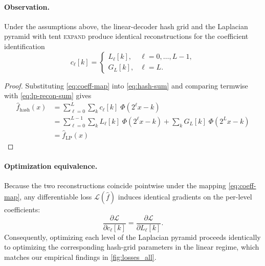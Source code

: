 \documentclass[a4paper,11pt,oneside]{article}
\numberwithin{equation}{section}
\begin{document}
\paragraph{Observation.}
Under the assumptions above, the linear-decoder hash grid and the Laplacian pyramid with tent \textsc{expand} produce identical reconstructions for the coefficient identification
\begin{equation}
\label{eq:coeff-map}
c_\ell[k]=
\begin{cases}
L_\ell[k], & \ell=0,\dots,L-1,\\[2pt]
G_L[k], & \ell=L.
\end{cases}
\end{equation}

\begin{proof}
Substituting \cref{eq:coeff-map} into \cref{eq:hash-sum} and comparing termwise with \cref{eq:lp-recon-sum} gives
\begin{equation}
\begin{aligned}
\widehat f_{\mathrm{hash}}(x)
&=\sum_{\ell=0}^{L}\sum_k c_\ell[k]\;\Phi(2^\ell x-k)\\
&=\sum_{\ell=0}^{L-1}\sum_k L_\ell[k]\;\Phi(2^\ell x-k)
+\sum_k G_L[k]\;\Phi(2^L x-k)\\
&=\widehat f_{\mathrm{LP}}(x)
\end{aligned}
\end{equation}
\end{proof}

\paragraph{Optimization equivalence.}
Because the two reconstructions coincide pointwise under the mapping
\cref{eq:coeff-map}, any differentiable loss $\mathcal{L}(\widehat f)$
induces identical gradients on the per-level coefficients:
\[
\frac{\partial \mathcal{L}}{\partial c_\ell[k]}
= \frac{\partial \mathcal{L}}{\partial L_\ell[k]}.
\]
Consequently, optimizing each level of the Laplacian pyramid proceeds
identically to optimizing the corresponding hash-grid parameters
in the linear regime, which matches our empirical findings in
\cref{fig:losses_all}.
\end{document}
